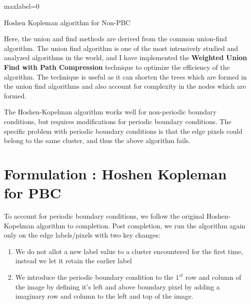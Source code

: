 \documentclass[12pt, a4paper]{report}
\begin{document}
\begin{algorithm}[H]
\SetAlgoLined
{}
 maxlabel=0\;
 \caption{Hoshen Kopleman algorithm for Non-PBC}
\end{algorithm}

Here, the union and find methods are derived from the common union-find algorithm. The union find algorithm is one of the most intensively studied and analyzed algorithms in the world, and I have implemented the \textbf{Weighted Union Find with Path Compression} technique to optimize the efficiency of the algorithm. The technique is useful as it can shorten the trees which are formed in the union find algorithms and also account for complexity in the nodes which are formed.

The Hoshen-Kopelman algorithm works well for non-periodic boundary conditions, but requires modifications for periodic boundary conditions. The specific problem with periodic boundary conditions is that the edge pixels could belong to the same cluster, and thus the above algorithm fails.

\section{Formulation : Hoshen Kopleman for PBC}
To account for periodic boundary conditions, we follow the original Hoshen-Kopelman algorithm to completion. Post completion, we run the algorithm again only on the edge labels/pixels with two key changes:

\begin{enumerate}
    \item We do not allot a new label value to a cluster encountered for the first time, instead we let it retain the earlier label
    \item We introduce the periodic boundary condition to the $1^{st}$ row and column of the image by defining it's left and above boundary pixel by adding a imaginary row and column to the left and top of the image. 
\end{enumerate}
\end{document}
